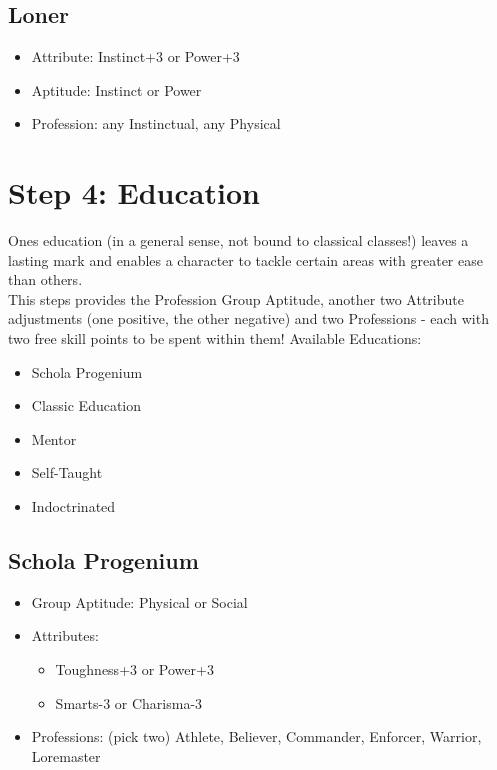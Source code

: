 \subsection{Loner}
\begin{itemize}
	\item Attribute: Instinct+3 or Power+3
	\item Aptitude: Instinct or Power
	\item Profession: any Instinctual, any Physical
\end{itemize}


\section{Step 4: Education} %
\label{sec:lifepath_4_education}
Ones education (in a general sense, not bound to classical classes!) leaves a lasting mark and enables a character to tackle certain areas with greater ease than others.\\
This steps provides the Profession Group Aptitude, another two Attribute adjustments (one positive, the other negative) and two Professions - each with two free skill points to be spent within them! Available Educations:
\begin{itemize}
	\item Schola Progenium
	\item Classic Education
	\item Mentor
	\item Self-Taught
	\item Indoctrinated
\end{itemize}

\subsection{Schola Progenium}
\begin{itemize}
	\item Group Aptitude: Physical or Social
	\item Attributes:
	\begin{itemize}
		\item Toughness+3 or Power+3
		\item Smarts-3 or Charisma-3
	\end{itemize}
	\item Professions: (pick two) Athlete, Believer, Commander, Enforcer, Warrior, Loremaster
\end{itemize}

